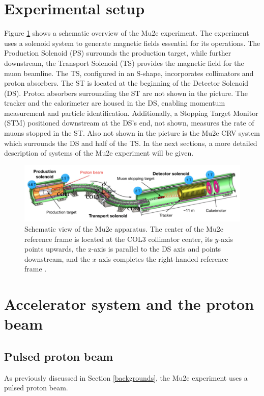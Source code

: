 \section{Experimental setup}\label{setup}
Figure \ref{fig:mu2escheme} shows a schematic overview 
of the Mu2e experiment. The experiment uses 
a solenoid system to generate magnetic fields essential 
for its operations. The Production Solenoid (PS) surrounds 
the production target, while further downstream, the 
Transport Solenoid (TS) provides the magnetic field for 
the muon beamline. The TS, configured in an S-shape, 
incorporates collimators and proton absorbers. The ST is 
located at the beginning of the Detector Solenoid (DS). 
Proton absorbers surrounding the ST are not shown in the picture. 
The tracker and the calorimeter are housed in the DS, 
enabling momentum measurement and particle identification. 
Additionally, a Stopping Target Monitor (STM) positioned 
downstream at the DS's end, not shown, measures the rate of muons stopped in the ST.
Also not shown 
in the picture is the Mu2e CRV system which 
surrounds the DS and half of the TS. In the next sections, a 
more detailed description of systems of the Mu2e experiment will be given.
\begin{figure}[!h]
\centering
\includegraphics[width =\textwidth]{figures/png/Screenshot_20240301_143105.png}
\caption[The Mu2e apparatus.]{Schematic view of the Mu2e apparatus. The center 
of the Mu2e reference frame is located at the COL3 collimator center, its $y$-axis 
points upwards, the z-axis is parallel to the DS axis and points downstream, and 
the $x$-axis completes the right-handed reference frame \cite{universe9010054}.}
\label{fig:mu2escheme}
\end{figure}
\section{Accelerator system and the proton beam}\label{accel}
\subsection{Pulsed proton beam}\label{pulsedprotonbeam}
As previously discussed in Section  \ref{backgrounds}, the Mu2e experiment uses a 
pulsed proton beam.

